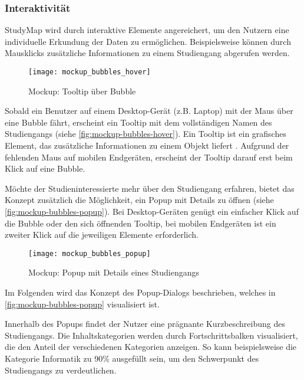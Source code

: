 \subsubsection{Interaktivität}
StudyMap wird durch interaktive Elemente angereichert, um den Nutzern eine individuelle Erkundung der Daten zu ermöglichen. Beispielsweise können durch Mausklicks zusätzliche Informationen zu einem Studiengang abgerufen werden.

\begin{figure}[H]
    \centering
    \texttt{[image: mockup\_bubbles\_hover]}
    \caption{Mockup: Tooltip über Bubble}
    \label{fig:mockup-bubbles-hover}
\end{figure}

Sobald ein Benutzer auf einem Desktop-Gerät (z.B. Laptop) mit der Maus über eine
Bubble fährt, erscheint ein Tooltip mit dem vollständigen Namen des Studiengangs
(siehe \autoref{fig:mockup-bubbles-hover}). Ein Tooltip ist ein grafisches
Element, das zusätzliche Informationen zu einem Objekt liefert \parencite{joyce_tooltip_2019}. Aufgrund der fehlenden Maus auf
mobilen Endgeräten, erscheint der Tooltip darauf erst beim Klick auf eine
Bubble. 

Möchte der Studieninteressierte mehr über den Studiengang erfahren, bietet das
Konzept zusätzlich die Möglichkeit, ein Popup mit Details zu öffnen (siehe
\autoref{fig:mockup-bubbles-popup}). Bei Desktop-Geräten genügt ein einfacher
Klick auf die Bubble oder den sich öffnenden Tooltip, bei mobilen
Endgeräten ist ein zweiter Klick auf die jeweiligen Elemente erforderlich.

\begin{figure}[H]
    \centering
    \texttt{[image: mockup\_bubbles\_popup]}
    \caption{Mockup: Popup mit Details eines Studiengangs}
    \label{fig:mockup-bubbles-popup}
\end{figure}

Im Folgenden wird das Konzept des Popup-Dialogs beschrieben, welches in \autoref{fig:mockup-bubbles-popup} visualisiert ist.

Innerhalb des Popups findet der Nutzer eine prägnante Kurzbeschreibung des Studiengangs. Die Inhaltskategorien werden durch Fortschrittsbalken visualisiert, die den Anteil der verschiedenen Kategorien anzeigen. So kann beispielsweise die Kategorie \glqq Informatik\grqq{} zu 90\% ausgefüllt sein, um den Schwerpunkt des Studiengangs zu verdeutlichen.

